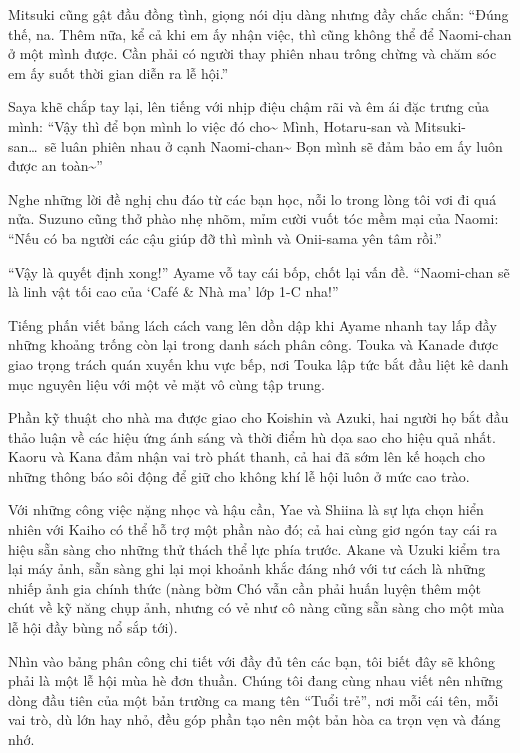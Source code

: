 \documentclass[../main.tex]{subfiles}
\begin{document}
Mitsuki cũng gật đầu đồng tình, giọng nói dịu dàng nhưng đầy chắc chắn: ``Đúng thế, na. Thêm nữa, kể cả khi em ấy nhận việc, thì cũng không thể để Naomi-chan ở một mình được. Cần phải có người thay phiên nhau trông chừng và chăm sóc em ấy suốt thời gian diễn ra lễ hội.''

Saya khẽ chắp tay lại, lên tiếng với nhịp điệu chậm rãi và êm ái đặc trưng của mình: ``Vậy thì để bọn mình lo việc đó cho\~{} Mình, Hotaru-san và Mitsuki-san\dots\ sẽ luân phiên nhau ở cạnh Naomi-chan\~{} Bọn mình sẽ đảm bảo em ấy luôn được an toàn\~{}''

Nghe những lời đề nghị chu đáo từ các bạn học, nỗi lo trong lòng tôi vơi đi quá nửa. Suzuno cũng thở phào nhẹ nhõm, mỉm cười vuốt tóc mềm mại của Naomi: ``Nếu có ba người các cậu giúp đỡ thì mình và Onii-sama yên tâm rồi.''

``Vậy là quyết định xong!'' Ayame vỗ tay cái bốp, chốt lại vấn đề. ``Naomi-chan sẽ là linh vật tối cao của `Café \& Nhà ma' lớp 1-C nha!''

Tiếng phấn viết bảng lách cách vang lên dồn dập khi Ayame nhanh tay lấp đầy những khoảng trống còn lại trong danh sách phân công. Touka và Kanade được giao trọng trách quán xuyến khu vực bếp, nơi Touka lập tức bắt đầu liệt kê danh mục nguyên liệu với một vẻ mặt vô cùng tập trung.

Phần kỹ thuật cho nhà ma được giao cho Koishin và Azuki, hai người họ bắt đầu thảo luận về các hiệu ứng ánh sáng và thời điểm hù dọa sao cho hiệu quả nhất. Kaoru và Kana đảm nhận vai trò phát thanh, cả hai đã sớm lên kế hoạch cho những thông báo sôi động để giữ cho không khí lễ hội luôn ở mức cao trào.

Với những công việc nặng nhọc và hậu cần, Yae và Shiina là sự lựa chọn hiển nhiên với Kaiho có thể hỗ trợ một phần nào đó; cả hai cùng giơ ngón tay cái ra hiệu sẵn sàng cho những thử thách thể lực phía trước. Akane và Uzuki kiểm tra lại máy ảnh, sẵn sàng ghi lại mọi khoảnh khắc đáng nhớ với tư cách là những nhiếp ảnh gia chính thức (nàng bờm Chó vẫn cần phải huấn luyện thêm một chút về kỹ năng chụp ảnh, nhưng có vẻ như cô nàng cũng sẵn sàng cho một mùa lễ hội đầy bùng nổ sắp tới).

Nhìn vào bảng phân công chi tiết với đầy đủ tên các bạn, tôi biết đây sẽ không phải là một lễ hội mùa hè đơn thuần. Chúng tôi đang cùng nhau viết nên những dòng đầu tiên của một bản trường ca mang tên ``Tuổi trẻ'', nơi mỗi cái tên, mỗi vai trò, dù lớn hay nhỏ, đều góp phần tạo nên một bản hòa ca trọn vẹn và đáng nhớ.
\end{document}
